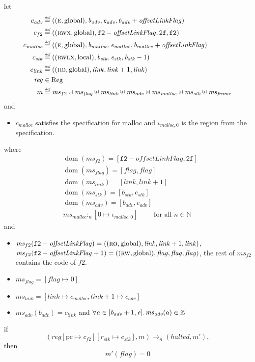 \documentclass[format=acmsmall, review=true, screen=true]{acmart}
\newcommand{\update}[2]{[#1 \mapsto #2]}
\newcommand{\defeq}{\stackrel{\textit{\tiny{def}}}{=}}
\DeclareMathOperator{\dom}{dom}
\newcommand{\var}[1]{\mathit{#1}}
\newcommand{\hs}{\var{ms}}
\newcommand{\ms}{\hs}
\newcommand{\pcreg}{\mathrm{pc}}
\newcommand{\addr}{\var{a}}
\newcommand{\start}{\var{b}}
\newcommand{\addrend}{\var{e}}
\newcommand{\reg}{\var{reg}}
\newcommand{\heap}{\var{mem}}
\newcommand{\adv}{\var{adv}}
\newcommand{\link}{\var{link}}
\newcommand{\stk}{\var{stk}}
\newcommand{\flag}{\var{flag}}
\newcommand{\olf}{\var{offsetLinkFlag}}
\newcommand{\halted}{\mathit{halted}}
\newcommand{\heapSat}[3][\heap]{#1 :_{#2} #3}
\newcommand{\codelabel}[1]{\mathit{#1}}
\newcommand{\malloc}{\codelabel{malloc}}
\newcommand{\plaindom}[1]{\mathrm{#1}}
\newcommand{\Regs}{\plaindom{Reg}}
\newcommand{\nats}{\mathbb{N}}
\newcommand{\ints}{\mathbb{Z}}
\newcommand{\plainperm}[1]{\textsc{#1}}
\newcommand{\readonly}{\plainperm{ro}}
\newcommand{\readwrite}{\plainperm{rw}}
\newcommand{\entry}{\plainperm{e}}
\newcommand{\rwx}{\plainperm{rwx}}
\newcommand{\rwlx}{\plainperm{rwlx}}
\newcommand{\plainlocality}[1]{\mathrm{#1}}
\newcommand{\local}{\plainlocality{local}}
\newcommand{\glob}{\plainlocality{global}}
\newcommand{\step}[1][]{\rightarrow_{#1}}
\begin{document}
\begin{lemma}
  \label{lem:correctness-f2-app}
  let
  \begin{align*}
    c_{\var{adv}} & \defeq ((\entry,\glob),\start_{\adv},\addrend_{\adv},\start_{\adv}+\olf) \\
    c_{f2} & \defeq ((\rwx,\glob),\mathtt{f2}-\olf,\mathtt{2f},\mathtt{f2}) \\
    c_\malloc & \defeq ((\entry,\glob),\start_\malloc,\addrend_\malloc,\start_\malloc+\olf) \\
    c_{\var{stk}} & \defeq ((\rwlx,\local),\start_\stk,\addrend_\stk,\start_\stk-1) \\
    c_\link & \defeq ((\readonly,\glob),\link,\link+1,\link)\\
    \reg & \in \Regs \\
    m & \defeq \hs_{f2} \uplus 
        \hs_\flag \uplus                
        \ms_{\var{link}} \uplus 
        \hs_\adv \uplus 
        \ms_{\malloc} \uplus 
        \ms_{\var{stk}} \uplus
        \ms_{\var{frame}} 
  \end{align*}
  and
  \begin{itemize}
  \item $c_\malloc$ satisfies the specification for malloc and $\iota_{\malloc,0}$ is the region from the specification.
  \end{itemize}
  where 
  \begin{align*}
    &\dom(\hs_{f2}) = [\mathtt{f2}-\olf,\mathtt{2f}] \\
    &\dom(\hs_\flag) = [\flag,\flag] \\
    &\dom(\ms_\link) = [\link,\link+1]\\
    &\dom(\ms_\stk) = [\start_\stk, \addrend_\stk]\\
    &\dom(\hs_{\adv}) = [\start_\adv,\addrend_\adv] \\
    &\heapSat[\hs_{\malloc}]{n}{[0 \mapsto \iota_{\malloc,0}]} \qquad \text{ for all $n \in \nats$}
  \end{align*}
  and
  \begin{itemize}
  \item $\ms_{f2}(\mathtt{f2}-\olf) = ((\readonly,\glob),\link,\link+1,\link)$, $\ms_{f2}(\mathtt{f2}-\olf+1) = ((\readwrite,\glob),\flag,\flag,\flag)$, the rest of $\hs_{f2}$ contains the code of $f2$.
  \item $\ms_\flag = [\flag \mapsto 0]$
  \item $\ms_{\var{link}} = [\var{link} \mapsto c_\malloc, \var{link} + 1 \mapsto c_\adv]$
  \item $\hs_\adv(\start_\adv) = c_\link$ and $\forall \addr \in [\start_\adv+1,\addrend]\ldotp \ms_\adv(a) \in \ints$
  \end{itemize}
  if 
  \[
    (\reg\update{\pcreg}{c_{f2}}\update{r_\stk}{c_\stk},m) \step[n] (\halted,m'),
  \]
  then
  \[
    m'(\flag) = 0
  \]  
\end{lemma}
\end{document}
